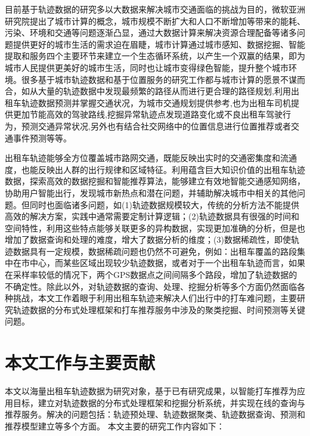 目前基于轨迹数据的研究多以大数据来解决城市交通面临的挑战为目的，微软亚洲研究院提出了城市计算的概念，城市规模不断扩大和人口不断增加等带来的能耗、污染、环境和交通等问题逐渐凸显，通过大数据计算来解决资源合理配备等诸多问题提供更好的城市生活的需求迫在眉睫，城市计算通过城市感知、数据挖掘、智能提取和服务四个主要环节来建立一个生态循环系统，以产生一个双赢的结果，即为城市人民提供更美好的城市生活，同时也让城市变得绿色智能，提升整个城市环境\cite{DBLP:conf/huc/ZhengLYX11}。很多基于城市轨迹数据和基于位置服务的研究工作都与城市计算的愿景不谋而合，如从大量的轨迹数据中发现最频繁的路径从而进行更合理的路径规划\cite{DBLP:conf/sigmod/LuoT0N13}\cite{DBLP:conf/icde/SuZHJ0Z14},利用出租车轨迹数据预测并掌握交通状况，为城市交通规划提供参考\cite{DBLP:conf/pervasive/CastroZL12},也为出租车司机提供更加节能高效的驾驶路线\cite{DBLP:conf/kdd/QuZLLX14}\cite{song37},挖掘异常轨迹点发现道路变化或不良出租车驾驶行为\cite{DBLP:conf/huc/ZhangLZCSL11}，预测交通异常状况\cite{DBLP:journals/dke/PangCLZ13},另外也有结合社交网络中的位置信息进行位置推荐或者交通事件预测\cite{export:191797}\cite{export:201131}等等。

出租车轨迹能够全方位覆盖城市路网交通，既能反映出实时的交通密集度和流通度，也能反映出人群的出行规律和区域特征。利用蕴含巨大知识价值的出租车轨迹数据，探索高效的数据挖掘和智能推荐算法，能够建立有效地智能交通感知网络，协助用户智能出行，发现城市新热点和潜在问题，并辅助解决城市中相关的其他问题。但同时也面临诸多问题，如(1)轨迹数据规模较大，传统的分析方法不能提供高效的解决方案，实践中通常需要定制计算逻辑；(2)轨迹数据具有很强的时间和空间特性，利用这些特点能够关联更多的异构数据，实现更加准确的分析，但是也增加了数据查询和处理的难度，增大了数据分析的维度；(3)数据稀疏性，即使轨迹数据具有一定规模，数据稀疏问题也仍然不可避免，例如：出租车覆盖的路段集中在市中心，而某些区域出现较少轨迹数据，或者对于一个出租车轨迹而言，如果在采样率较低的情况下，两个GPS数据点之间间隔多个路段，增加了轨迹数据的不确定性。除此以外，对轨迹数据的查询、处理、挖掘分析等多个方面仍然面临各种挑战，本文工作着眼于利用出租车轨迹来解决人们出行中的打车难问题，主要研究轨迹数据的分布式处理框架和打车推荐服务中涉及的聚类挖掘、时间预测等关键问题。


\section{本文工作与主要贡献}

本文以海量出租车轨迹数据为研究对象，基于已有研究成果，以智能打车推荐为应用目标，建立对轨迹数据的分布式处理框架和挖掘分析系统，并实现在线的查询与推荐服务。解决的问题包括：轨迹预处理、轨迹数据聚类、轨迹数据查询、预测和推荐模型建立等多个方面。
本文主要的研究工作内容如下：

